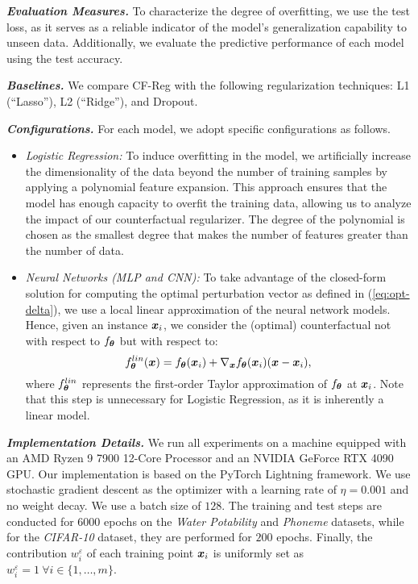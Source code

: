 \smallskip
\noindent\textbf{\textit{Evaluation Measures.}} To characterize the degree of overfitting, we use the test loss, as it serves as a reliable indicator of the model's generalization capability to unseen data. Additionally, we evaluate the predictive performance of each model using the test accuracy.

\smallskip
\noindent\textbf{\textit{Baselines.}} We compare CF-Reg with the following regularization techniques: L1 (``Lasso''), L2 (``Ridge''), and Dropout.

\smallskip
\noindent\textbf{\textit{Configurations.}}
For each model, we adopt specific configurations as follows.
\begin{itemize}
\item \textit{Logistic Regression:} To induce overfitting in the model, we artificially increase the dimensionality of the data beyond the number of training samples by applying a polynomial feature expansion. This approach ensures that the model has enough capacity to overfit the training data, allowing us to analyze the impact of our counterfactual regularizer. The degree of the polynomial is chosen as the smallest degree that makes the number of features greater than the number of data.
\item \textit{Neural Networks (MLP and CNN):} To take advantage of the closed-form solution for computing the optimal perturbation vector as defined in (\ref{eq:opt-delta}), we use a local linear approximation of the neural network models. Hence, given an instance $\boldsymbol{x}_i$, we consider the (optimal) counterfactual not with respect to $f_{\boldsymbol{\theta}}$ but with respect to:
\begin{equation}
\label{eq:taylor}
    f_{\boldsymbol{\theta}}^{lin}(\boldsymbol{x}) = f_{\boldsymbol{\theta}}(\boldsymbol{x}_i) + \nabla_{\boldsymbol{x}}f_{\boldsymbol{\theta}}(\boldsymbol{x}_i)(\boldsymbol{x} - \boldsymbol{x}_i),
\end{equation}
where $f_{\boldsymbol{\theta}}^{lin}$ represents the first-order Taylor approximation of $f_{\boldsymbol{\theta}}$ at $\boldsymbol{x}_i$.
Note that this step is unnecessary for Logistic Regression, as it is inherently a linear model.
\end{itemize}

\smallskip
\noindent \textbf{\textit{Implementation Details.}} We run all experiments on a machine equipped with an AMD Ryzen 9 7900 12-Core Processor and an NVIDIA GeForce RTX 4090 GPU. Our implementation is based on the PyTorch Lightning framework. We use stochastic gradient descent as the optimizer with a learning rate of $\eta = 0.001$ and no weight decay. We use a batch size of $128$. The training and test steps are conducted for $6000$ epochs on the \textit{Water Potability} and \textit{Phoneme} datasets, while for the \textit{CIFAR-10} dataset, they are performed for $200$ epochs.
Finally, the contribution $w_i^{\varepsilon}$ of each training point $\boldsymbol{x}_i$ is uniformly set as $w_i^{\varepsilon} = 1~\forall i\in \{1,\ldots,m\}$.

